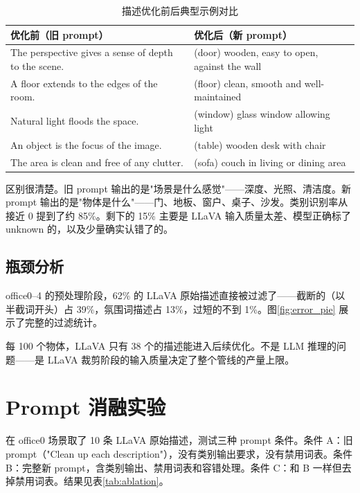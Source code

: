 \begin{table}[H]
\centering
\caption{描述优化前后典型示例对比}
\label{tab:caption_quality}
\small
\begin{tabular}{p{6.5cm}p{6.5cm}}
\toprule
\textbf{优化前（旧 prompt）} & \textbf{优化后（新 prompt）} \\
\midrule
The perspective gives a sense of depth to the scene. & (door) wooden, easy to open, against the wall \\
A floor extends to the edges of the room. & (floor) clean, smooth and well-maintained \\
Natural light floods the space. & (window) glass window allowing light \\
An object is the focus of the image. & (table) wooden desk with chair \\
The area is clean and free of any clutter. & (sofa) couch in living or dining area \\
\bottomrule
\end{tabular}
\end{table}

区别很清楚。旧 prompt 输出的是"场景是什么感觉"——深度、光照、清洁度。新 prompt 输出的是"物体是什么"——门、地板、窗户、桌子、沙发。类别识别率从接近 0 提到了约 85\%。剩下的 15\% 主要是 LLaVA 输入质量太差、模型正确标了 unknown 的，以及少量确实认错了的。

\subsection{瓶颈分析}

office0--4 的预处理阶段，62\% 的 LLaVA 原始描述直接被过滤了——截断的（以半截词开头）占 39\%，氛围词描述占 13\%，过短的不到 1\%。图\ref{fig:error_pie} 展示了完整的过滤统计。



每 100 个物体，LLaVA 只有 38 个的描述能进入后续优化。不是 LLM 推理的问题——是 LLaVA 裁剪阶段的输入质量决定了整个管线的产量上限。

\section{Prompt 消融实验}

在 office0 场景取了 10 条 LLaVA 原始描述，测试三种 prompt 条件。条件 A：旧 prompt（"Clean up each description"），没有类别输出要求，没有禁用词表。条件 B：完整新 prompt，含类别输出、禁用词表和容错处理。条件 C：和 B 一样但去掉禁用词表。结果见表\ref{tab:ablation}。

